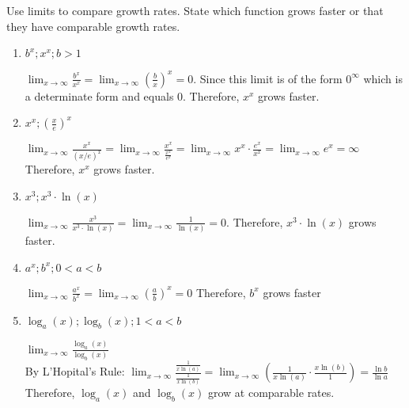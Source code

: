 \documentclass[nooutcomes,handout]{ximera}
\begin{document}
\begin{problem}
Use limits to compare growth rates.  State which function grows faster or that they have comparable growth rates.

\begin{enumerate}
	\item$b^x; x^x; b>1$
		\begin{freeResponse}
		$\lim_{x \to \infty}\frac{b^x}{x^x}=\lim_{x \to \infty}\left(\frac{b}{x}\right)^x=0$.  Since this limit is of the form $0^{\infty}$ which is a determinate form and equals $0$.
		Therefore, $x^x$ grows faster.
		
		\end{freeResponse}
	
	\item $x^x; \left(\frac{x}{e}\right)^x$
		\begin{freeResponse}
		$\lim_{x \to \infty}\frac{x^x}{(x/e)^x}=\lim_{x \to \infty}\frac{x^x}{\frac{x^x}{e^x}}=\lim_{x \to \infty}{x^x}\cdot{\frac{e^x}{x^x}}=\lim_{x \to \infty}{e^x}=\infty$  Therefore, $x^x$ grows faster.
		
		\end{freeResponse}
	

	
	\item $x^3; x^3 \cdot \ln(x)$
		\begin{freeResponse}
		$\lim_{x \to \infty}\frac{x^3}{x^3 \cdot \ln(x)}=\lim_{x \to \infty}\frac{1}{\ln(x)}=0$.  
		Therefore, $x^3 \cdot \ln(x)$ grows faster.
		
		\end{freeResponse}
	\item $a^x; b^x; 0<a<b$
	\begin{freeResponse}
		$\lim_{x \to \infty}\frac{a^x}{b^x}=\lim_{x \to \infty}\left(\frac{a}{b}\right)^x=0$
		Therefore, $b^x$ grows faster
	
	
	\end{freeResponse}
	\item $\log_a(x); \log_b(x); 1<a<b$
	\begin{freeResponse}
	$\lim_{x \to \infty}\frac{\log_a(x)}{\log_b(x)}$\\
	By L'Hopital's Rule: $\lim_{x \to \infty}\frac{\frac{1}{x\ln(a)}}{\frac{1}{x\ln(b)}}=\lim_{x \to \infty}\left(\frac{1}{x\ln(a)} \cdot \frac{x\ln(b)}{1}\right)=\frac{\ln b}{\ln a}$\\
	Therefore, $\log_a(x)$ and $\log_b(x)$ grow at comparable rates.
	

\end{freeResponse}
\end{enumerate}
\end{problem}
\end{document}
